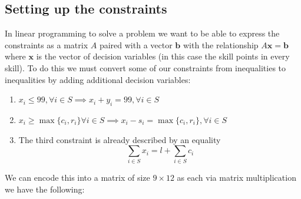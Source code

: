 \documentclass{article}
\begin{document}
\subsection{Setting up the constraints}
\par In linear programming to solve a problem we want to be able to express the constraints as a matrix $A$ paired with a vector $\boldsymbol{b}$ with the relationship $A\boldsymbol{x} = \boldsymbol{b}$ where $\boldsymbol{x}$ is the vector of decision variables (in this case the skill points in every skill). To do this we must convert some of our constraints from inequalities to inequalities by adding additional decision variables:
\begin{enumerate}
    \item $x_i \leq 99, \forall i \in S \implies x_i + y_i = 99, \forall i \in S$
    \item $x_i \geq \max\{c_i, r_i\} \forall i \in S \implies x_i - s_i = \max\{c_i, r_i\}, \forall i \in S$
    \item The third constraint is already described by an equality $$\sum_{i \in S} x_i = l + \sum_{i \in S} c_i$$
\end{enumerate}
\pagebreak
\par We can encode this into a matrix of size $9 \times 12$ as each via matrix multiplication we have the following:
\setcounter{MaxMatrixCols}{12}
\end{document}
